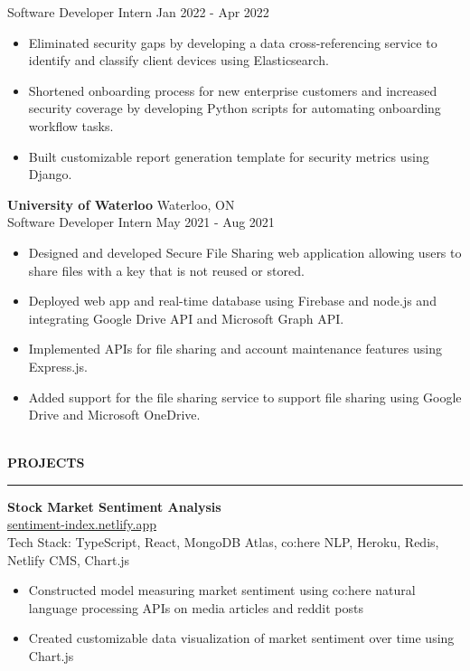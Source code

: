 \documentclass[11pt]{article}
\def \prim {MidnightBlue}
\def \link {\faLink}
\begin{document}
Software Developer Intern \hfill Jan 2022 - Apr 2022
\begin{itemize}[noitemsep, topsep=2pt, parsep=2pt]
\item
Eliminated security gaps by developing a data cross-referencing service to identify and classify client devices using Elasticsearch.
\item
Shortened onboarding process for new enterprise customers and increased security coverage by developing Python scripts for automating onboarding workflow tasks.
\item
Built customizable report generation template for security metrics using Django. \\
\end{itemize}
\noindent\textbf{University of Waterloo} \hfill Waterloo, ON\\
Software Developer Intern \hfill May 2021 - Aug 2021
\begin{itemize}[noitemsep, topsep=2pt, parsep=2pt]
\item
Designed and developed Secure File Sharing web application allowing users to share files with a key that is not reused or stored.
\item
Deployed web app and real-time database using Firebase and node.js and integrating Google Drive API and Microsoft Graph API.
\item
Implemented APIs for file sharing and account maintenance features using Express.js.
\item
Added support for the file sharing service to support file sharing using Google Drive and Microsoft OneDrive.
\end{itemize}
\color{\prim}
\noindent
\large \\
\noindent\space\textbf{PROJECTS}
\normalsize
\vspace{1.1pt}
\hrule
\color{Black}
\medskip
\noindent
\textbf{Stock Market Sentiment Analysis} \hfill \\
\link\space\href{https://sentiment-index.netlify.app/}{sentiment-index.netlify.app} \\
Tech Stack: TypeScript, React, MongoDB Atlas, co:here NLP, Heroku, Redis, Netlify CMS, Chart.js 
\begin{itemize}[noitemsep, topsep=2pt, parsep=2pt]
\item
Constructed model measuring market sentiment using co:here natural language processing APIs on media articles and reddit posts
\item
Created customizable data visualization of market sentiment over time using Chart.js \\
\end{itemize}
\end{document}
